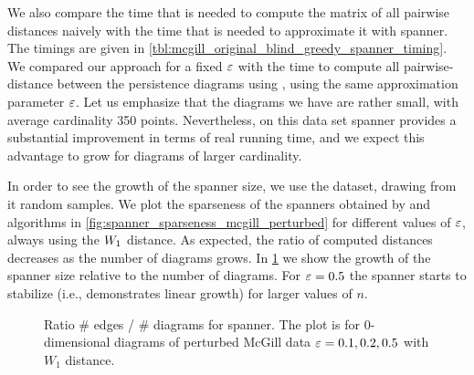 We also compare the time that is needed to compute the matrix of all pairwise distances
naively with the time that is needed to approximate it with \bgrdy spanner.
The timings are given in \cref{tbl:mcgill_original_blind_greedy_spanner_timing}.
We compared our approach for a fixed
$\varepsilon$ with the time to compute all pairwise-distance between the
persistence diagrams using \hera, using the same approximation parameter
$\varepsilon$. Let us emphasize that the diagrams we have are rather small,
with average cardinality
350 points. Nevertheless, on this data set \bgrdy spanner
provides a substantial improvement in terms of real running time,
and we expect this advantage to grow for diagrams of larger cardinality.



In order to see the growth of the spanner size, we use the 
dataset, drawing from it random samples.
We plot the sparseness of the spanners obtained by \grdy
and \bgrdy algorithms in \cref{fig:spanner_sparseness_mcgill_perturbed}
for different values of $\varepsilon$, always using the ${W_{1}}$ distance.
As expected, the ratio of computed distances decreases as the number of diagrams
grows. In \cref{fig:spanner_ratio_mcgill_perturbed} we show
the growth of the spanner size relative to the number of diagrams.
For $\varepsilon = 0.5$ the \bgrdy spanner starts to stabilize (i.e., demonstrates
linear growth) for larger values of $n$.




\begin{figure}[!htbp]
    \begin{centering}
\end{centering}
    \caption{Ratio \# edges /  \# diagrams for  \bgrdy spanner. The plot is for 0-dimensional diagrams of perturbed McGill data
    $\varepsilon = 0.1, 0.2, 0.5$ with $W_1$ distance.}
    \label{fig:spanner_ratio_mcgill_perturbed}
\end{figure}





